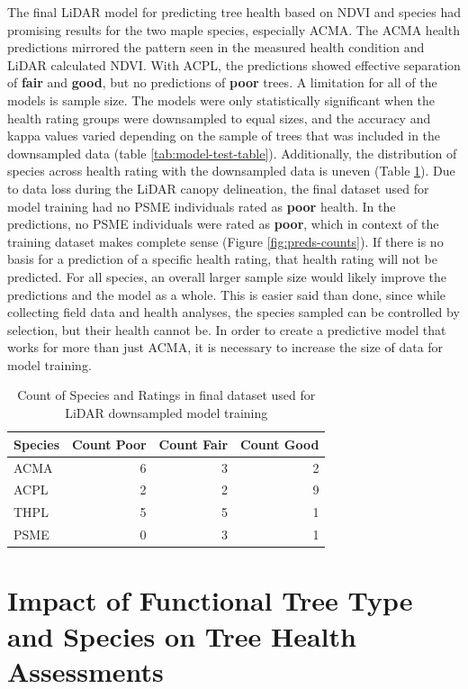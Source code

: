 \documentclass[12pt,twoside]{reedthesis}
\begin{document}
The final LiDAR model for predicting tree health based on NDVI and
species had promising results for the two maple species, especially
ACMA. The ACMA health predictions mirrored the pattern seen in the
measured health condition and LiDAR calculated NDVI. With ACPL, the
predictions showed effective separation of \textbf{fair} and \textbf{good}, but no
predictions of \textbf{poor} trees. A limitation for all of the models is
sample size. The models were only statistically significant when the
health rating groups were downsampled to equal sizes, and the accuracy
and kappa values varied depending on the sample of trees that was
included in the downsampled data (table \ref{tab:model-test-table}).
Additionally, the distribution of species across health rating with the
downsampled data is uneven (Table \ref{tab:species-counts-bleh}). Due
to data loss during the LiDAR canopy delineation, the final dataset used
for model training had no PSME individuals rated as \textbf{poor} health. In
the predictions, no PSME individuals were rated as \textbf{poor}, which in
context of the training dataset makes complete sense (Figure
\ref{fig:preds-counts}). If there is no basis for a prediction of a
specific health rating, that health rating will not be predicted. For
all species, an overall larger sample size would likely improve the
predictions and the model as a whole. This is easier said than done,
since while collecting field data and health analyses, the species
sampled can be controlled by selection, but their health cannot be. In
order to create a predictive model that works for more than just ACMA,
it is necessary to increase the size of data for model training.
\begin{table}

\caption{\label{tab:species-counts-bleh}Count of Species and Ratings in final dataset used for LiDAR downsampled model training}
\centering
\begin{tabular}[t]{lrrr}
\toprule
Species & Count Poor & Count Fair & Count Good\\
\midrule
ACMA & 6 & 3 & 2\\
ACPL & 2 & 2 & 9\\
THPL & 5 & 5 & 1\\
PSME & 0 & 3 & 1\\
\bottomrule
\end{tabular}
\end{table}
\hypertarget{impact-of-functional-tree-type-and-species-on-tree-health-assessments}{%
\section{Impact of Functional Tree Type and Species on Tree Health Assessments}\label{impact-of-functional-tree-type-and-species-on-tree-health-assessments}}
\end{document}

